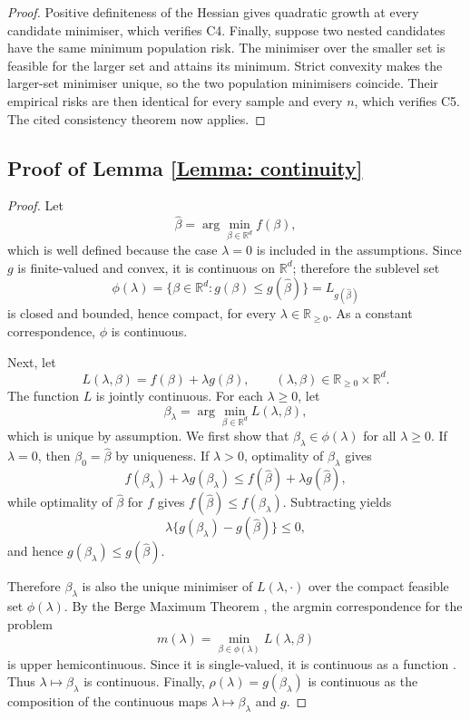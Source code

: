 \documentclass[12pt]{article}
\newenvironment{bluechange}{\begingroup\color[rgb]{0.00,0.00,1.00}}{\endgroup}
\theoremstyle{remark}
\theoremstyle{plain}
\begin{document}
\begin{bluechange}
\begin{proof}
Positive definiteness of the Hessian gives quadratic growth at every candidate minimiser, which verifies C4. Finally, suppose two nested candidates have the same minimum population risk. The minimiser over the smaller set is feasible for the larger set and attains its minimum. Strict convexity makes the larger-set minimiser unique, so the two population minimisers coincide. Their empirical risks are then identical for every sample and every $n$, which verifies C5. The cited consistency theorem now applies.
\end{proof}
\end{bluechange}

\subsection{Proof of Lemma \ref{Lemma: continuity}}
\begin{proof}
Let
\[
\hat{\beta}=\arg\min_{\beta\in\mathbb{R}^d} f(\beta),
\]
which is well defined because the case $\lambda=0$ is included in the assumptions. Since $g$ is finite-valued and convex, it is continuous on $\mathbb{R}^d$; therefore the sublevel set
\[
\phi(\lambda)=\{\beta\in\mathbb{R}^d:g(\beta)\le g(\hat{\beta})\}=L_{g(\hat{\beta})}
\]
is closed and bounded, hence compact, for every $\lambda\in\mathbb{R}_{\ge 0}$. As a constant correspondence, $\phi$ is continuous.

Next, let
\[
L(\lambda,\beta)=f(\beta)+\lambda g(\beta),\qquad (\lambda,\beta)\in \mathbb{R}_{\ge 0}\times\mathbb{R}^d.
\]
The function $L$ is jointly continuous. For each $\lambda\ge 0$, let
\[
\beta_\lambda=\arg\min_{\beta\in\mathbb{R}^d} L(\lambda,\beta),
\]
which is unique by assumption. We first show that $\beta_\lambda\in\phi(\lambda)$ for all $\lambda\ge0$. If $\lambda=0$, then $\beta_0=\hat{\beta}$ by uniqueness. If $\lambda>0$, optimality of $\beta_\lambda$ gives
\[
f(\beta_\lambda)+\lambda g(\beta_\lambda)\le f(\hat{\beta})+\lambda g(\hat{\beta}),
\]
while optimality of $\hat{\beta}$ for $f$ gives $f(\hat{\beta})\le f(\beta_\lambda)$. Subtracting yields
\[
\lambda\{g(\beta_\lambda)-g(\hat{\beta})\}\le 0,
\]
and hence $g(\beta_\lambda)\le g(\hat{\beta})$.

Therefore $\beta_\lambda$ is also the unique minimiser of $L(\lambda,\cdot)$ over the compact feasible set $\phi(\lambda)$. By the Berge Maximum Theorem \citep[Theorem 17.31]{aliprantis_infinite_2006}, the argmin correspondence for the problem
\[
m(\lambda)=\min_{\beta\in\phi(\lambda)} L(\lambda,\beta)
\]
is upper hemicontinuous. Since it is single-valued, it is continuous as a function \citep[Lemma 17.6]{aliprantis_infinite_2006}. Thus $\lambda\mapsto \beta_\lambda$ is continuous. Finally, $\rho(\lambda)=g(\beta_\lambda)$ is continuous as the composition of the continuous maps $\lambda\mapsto\beta_\lambda$ and $g$.
\end{proof}
\end{document}
